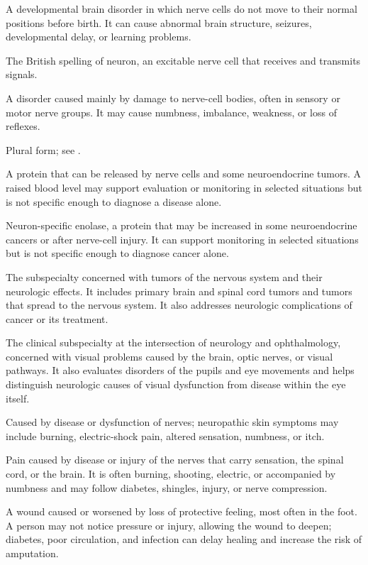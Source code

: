 A developmental brain disorder in which nerve cells do not move to their normal positions before birth. It can cause abnormal brain structure, seizures, developmental delay, or learning problems.

 The British spelling of neuron, an excitable nerve cell that receives and transmits signals.

 A disorder caused mainly by damage to nerve-cell bodies, often in sensory or motor nerve groups. It may cause numbness, imbalance, weakness, or loss of reflexes.

 Plural form; see .

 A protein that can be released by nerve cells and some neuroendocrine tumors. A raised blood level may support evaluation or monitoring in selected situations but is not specific enough to diagnose a disease alone.

 Neuron-specific enolase, a protein that may be increased in some neuroendocrine cancers or after nerve-cell injury. It can support monitoring in selected situations but is not specific enough to diagnose cancer alone.

 The subspecialty concerned with tumors of the nervous system and their
neurologic effects. It includes primary brain and spinal cord tumors and tumors that
spread to the nervous system. It also addresses neurologic complications of cancer
or its treatment.

 The clinical subspecialty at the intersection of neurology and ophthalmology,
concerned with visual problems caused by the brain, optic nerves, or visual pathways. It
also evaluates disorders of the pupils and eye movements and helps distinguish neurologic
causes of visual dysfunction from disease within the eye itself.

 Caused by disease or dysfunction of nerves; neuropathic skin symptoms may include burning, electric-shock pain, altered sensation, numbness, or itch.

 Pain caused by disease or injury of the nerves that carry sensation, the spinal cord, or the brain. It is often burning, shooting, electric, or accompanied by numbness and may follow diabetes, shingles, injury, or nerve compression.

 A wound caused or worsened by loss of protective feeling, most often in the foot. A person may not notice pressure or injury, allowing the wound to deepen; diabetes, poor circulation, and infection can delay healing and increase the risk of amputation.

